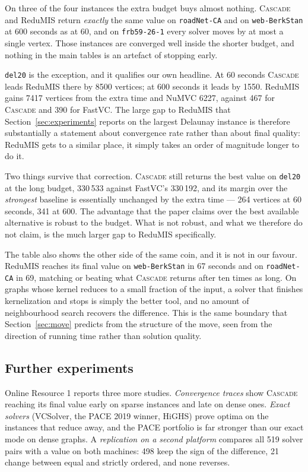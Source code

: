 \documentclass[pdflatex,sn-mathphys-num]{sn-jnl}
\theoremstyle{thmstyleone}%
\theoremstyle{thmstyletwo}%
\begin{document}
On three of the four instances the extra budget buys almost nothing.
\textsc{Cascade} and ReduMIS return \emph{exactly} the same value on
\texttt{roadNet-CA} and on \texttt{web-BerkStan} at 600 seconds as at 60, and on
\texttt{frb59-26-1} every solver moves by at most a single vertex. Those
instances are converged well inside the shorter budget, and nothing in the main
tables is an artefact of stopping early.

\texttt{del20} is the exception, and it qualifies our own headline. At 60
seconds \textsc{Cascade} leads ReduMIS there by 8500 vertices; at 600 seconds it
leads by 1550. ReduMIS gains 7417 vertices from the extra time and NuMVC 6227,
against 467 for \textsc{Cascade} and 390 for FastVC. The large gap to ReduMIS
that Section~\ref{sec:experiments} reports on the largest Delaunay instance is
therefore substantially a statement about convergence rate rather than about
final quality: ReduMIS gets to a similar place, it simply takes an order of
magnitude longer to do it.

Two things survive that correction. \textsc{Cascade} still returns the best value
on \texttt{del20} at the long budget, 330\,533 against FastVC's 330\,192, and its
margin over the \emph{strongest} baseline is essentially unchanged by the extra
time --- 264 vertices at 60 seconds, 341 at 600. The advantage that the paper
claims over the best available alternative is robust to the budget. What is not
robust, and what we therefore do not claim, is the much larger gap to ReduMIS
specifically.

The table also shows the other side of the same coin, and it is not in our
favour. ReduMIS reaches its final value on \texttt{web-BerkStan} in 67 seconds
and on \texttt{roadNet-CA} in 69, matching or beating what \textsc{Cascade}
returns after ten times as long. On graphs whose kernel reduces to a small
fraction of the input, a solver that finishes kernelization and stops is simply
the better tool, and no amount of neighbourhood search recovers the difference.
This is the same boundary that Section~\ref{sec:move} predicts from the
structure of the move, seen from the direction of running time rather than
solution quality.



\subsection{Further experiments}

Online Resource 1 reports three more studies. \emph{Convergence traces} show \textsc{Cascade}
reaching its final value early on sparse instances and late on dense ones. \emph{Exact solvers}
(VCSolver, the PACE 2019 winner, HiGHS) prove optima on the instances that reduce away, and
the PACE portfolio is far stronger than our exact mode on dense graphs. A \emph{replication on a
second platform} compares all 519 solver pairs with a value on both machines: 498 keep the sign
of the difference, 21 change between equal and strictly ordered, and none reverses.
\end{document}
